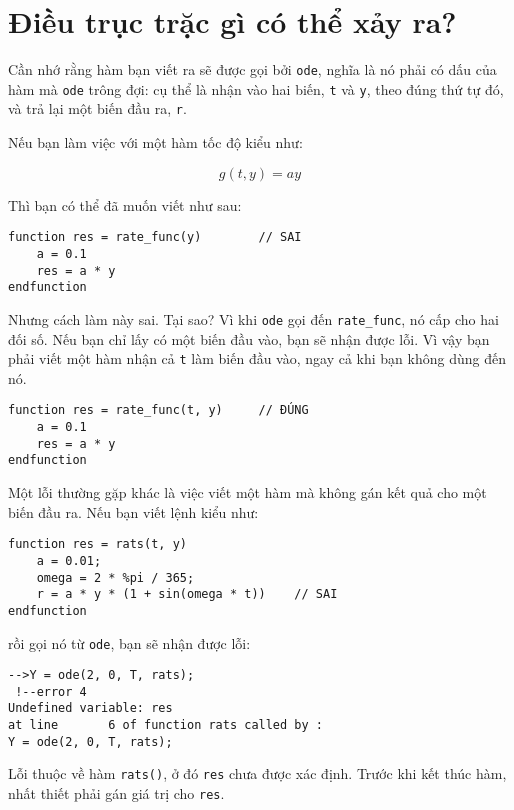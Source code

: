 \documentclass[12pt]{book}
\begin{document}
\section{Điều trục trặc gì có thể xảy ra?}

%
%

Cần nhớ rằng hàm bạn viết ra sẽ được gọi bởi
{\tt ode}, nghĩa là nó phải có dấu của hàm mà {\tt ode}
trông đợi: cụ thể là nhận vào hai biến, {\tt t} và {\tt y},
theo đúng thứ tự đó, và trả lại một biến đầu ra, {\tt r}.

Nếu bạn làm việc với một hàm tốc độ kiểu như:

\[ g(t, y) = a y \]

Thì bạn có thể đã muốn viết như sau:

\begin{verbatim}
function res = rate_func(y)        // SAI
    a = 0.1
    res = a * y
endfunction
\end{verbatim}
%
Nhưng cách làm này sai. Tại sao? Vì khi {\tt ode} gọi đến
\verb#rate_func#, nó cấp cho hai đối số. Nếu bạn chỉ lấy có
một biến đầu vào, bạn sẽ nhận được lỗi. Vì vậy bạn phải viết
một hàm nhận cả {\tt t} làm biến đầu vào, ngay cả khi bạn
không dùng đến nó.

\begin{verbatim}
function res = rate_func(t, y)     // ĐÚNG
    a = 0.1
    res = a * y
endfunction
\end{verbatim}
%
Một lỗi thường gặp khác là việc viết một hàm mà không gán
kết quả cho một biến đầu ra. Nếu bạn viết lệnh kiểu như:

\begin{verbatim}
function res = rats(t, y)
    a = 0.01;
    omega = 2 * %pi / 365;
    r = a * y * (1 + sin(omega * t))    // SAI
endfunction
\end{verbatim}
%
\noindent rồi gọi nó từ {\tt ode}, bạn sẽ nhận được lỗi:

\begin{verbatim}
-->Y = ode(2, 0, T, rats);
 !--error 4 
Undefined variable: res
at line       6 of function rats called by :  
Y = ode(2, 0, T, rats);
\end{verbatim}
%
Lỗi thuộc về hàm \texttt{rats()}, ở đó \texttt{res} chưa được
xác định. Trước khi kết thúc hàm, nhất thiết phải gán giá trị cho 
\texttt{res}.
\end{document}
